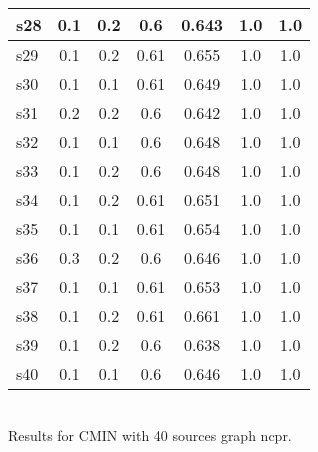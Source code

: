 \documentclass{article}
\begin{document}
\begin{tabular}{|l|c|c|c|c|c|c|}
\hline
s28 &0.1 & 0.2 & 0.6 & 0.643 & 1.0 & 1.0\\
\hline
s29 &0.1 & 0.2 & 0.61 & 0.655 & 1.0 & 1.0\\
\hline
s30 &0.1 & 0.1 & 0.61 & 0.649 & 1.0 & 1.0\\
\hline
s31 &0.2 & 0.2 & 0.6 & 0.642 & 1.0 & 1.0\\
\hline
s32 &0.1 & 0.1 & 0.6 & 0.648 & 1.0 & 1.0\\
\hline
s33 &0.1 & 0.2 & 0.6 & 0.648 & 1.0 & 1.0\\
\hline
s34 &0.1 & 0.2 & 0.61 & 0.651 & 1.0 & 1.0\\
\hline
s35 &0.1 & 0.1 & 0.61 & 0.654 & 1.0 & 1.0\\
\hline
s36 &0.3 & 0.2 & 0.6 & 0.646 & 1.0 & 1.0\\
\hline
s37 &0.1 & 0.1 & 0.61 & 0.653 & 1.0 & 1.0\\
\hline
s38 &0.1 & 0.2 & 0.61 & 0.661 & 1.0 & 1.0\\
\hline
s39 &0.1 & 0.2 & 0.6 & 0.638 & 1.0 & 1.0\\
\hline
s40 &0.1 & 0.1 & 0.6 & 0.646 & 1.0 & 1.0\\
\hline
\end{tabular}\\

\noindent Results for CMIN with 40 sources graph ncpr.
\end{document}
